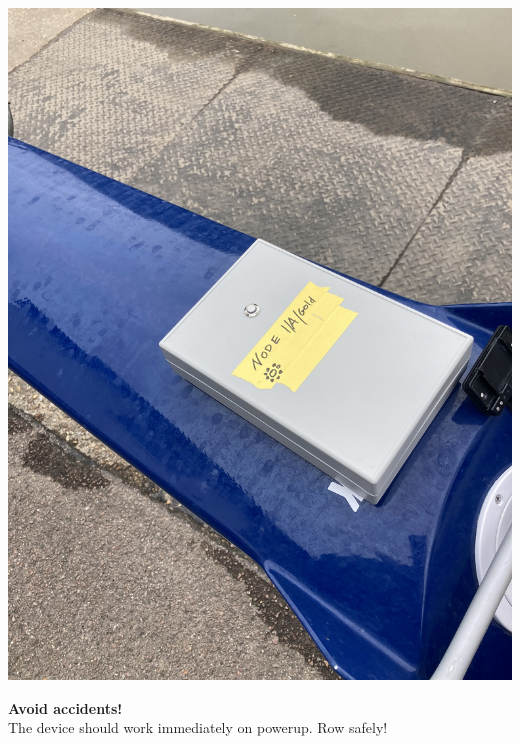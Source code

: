 \documentclass[12pt,a4paper]{report}
\begin{document}
\begin{center}
\includegraphics[scale = 0.1]{boxOnBoat.jpeg}
\end{center}

\textbf{Avoid accidents!} \\
The device should work immediately on powerup. Row safely!
\end{document}
